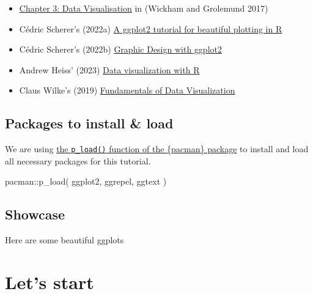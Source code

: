 \documentclass[
  letterpaper,
  DIV=11,
  numbers=noendperiod]{scrartcl}
\newenvironment{Shaded}{\begin{snugshade}}{\end{snugshade}}
\newcommand{\FunctionTok}[1]{\textcolor[rgb]{0.28,0.35,0.67}{#1}}
\newcommand{\NormalTok}[1]{\textcolor[rgb]{0.00,0.23,0.31}{#1}}
\newcommand{\SpecialCharTok}[1]{\textcolor[rgb]{0.37,0.37,0.37}{#1}}
\providecommand{\tightlist}{%
  \setlength{\itemsep}{0pt}\setlength{\parskip}{0pt}}\usepackage{longtable,booktabs,array}
\begin{document}
\begin{itemize}
\tightlist
\item
  \href{https://r4ds.had.co.nz/data-visualisation.html}{Chapter 3: Data
  Visualisation} in (Wickham and Grolemund 2017)
\item
  Cédric Scherer's (2022a)
  \href{https://www.cedricscherer.com/2019/08/05/a-ggplot2-tutorial-for-beautiful-plotting-in-r/}{A
  ggplot2 tutorial for beautiful plotting in R}
\item
  Cédric Scherer's (2022b)
  \href{https://rstudio-conf-2022.github.io/ggplot2-graphic-design/}{Graphic
  Design with ggplot2}
\item
  Andrew Heiss' (2023)
  \href{https://datavizs23.classes.andrewheiss.com/content/01-content.html}{Data
  visualization with R}
\item
  Claus Wilke's (2019)
  \href{https://clauswilke.com/dataviz/}{Fundamentals of Data
  Visualization}
\end{itemize}

\hypertarget{packages-to-install-load}{%
\subsection{Packages to install \&
load}\label{packages-to-install-load}}

We are using
\href{https://schmidtpaul.github.io/dsfair_quarto/summaryarticles/usefulthings.html\#pacman}{the
\texttt{p\_load()} function of the \{pacman\} package} to install and
load all necessary packages for this tutorial.

\begin{Shaded}
\begin{Highlighting}[]
\NormalTok{pacman}\SpecialCharTok{::}\FunctionTok{p\_load}\NormalTok{(}
\NormalTok{  ggplot2,}
\NormalTok{  ggrepel,}
\NormalTok{  ggtext}
\NormalTok{  )}
\end{Highlighting}
\end{Shaded}

\hypertarget{showcase}{%
\subsection{Showcase}\label{showcase}}

Here are some beautiful ggplots

\hypertarget{lets-start}{%
\section{Let's start}\label{lets-start}}
\end{document}
